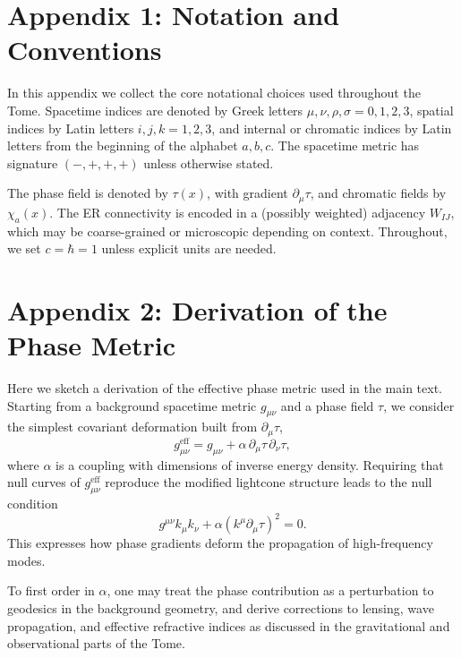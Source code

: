 

\appendix
\renewcommand{\thechapter}{\arabic{chapter}}

\chapter{Appendix 1: Notation and Conventions}

In this appendix we collect the core notational choices used throughout the Tome.
Spacetime indices are denoted by Greek letters \(\mu,\nu,\rho,\sigma = 0,1,2,3\), spatial indices by Latin letters \(i,j,k = 1,2,3\), and internal or chromatic indices by Latin letters from the beginning of the alphabet \(a,b,c\).
The spacetime metric has signature \((-,+,+,+)\) unless otherwise stated.

The phase field is denoted by \(\tau(x)\), with gradient \(\partial_\mu \tau\), and chromatic fields by \(\chi_a(x)\).
The ER connectivity is encoded in a (possibly weighted) adjacency \(W_{IJ}\), which may be coarse-grained or microscopic depending on context.
Throughout, we set \(c = \hbar = 1\) unless explicit units are needed.

\chapter{Appendix 2: Derivation of the Phase Metric}

Here we sketch a derivation of the effective phase metric used in the main text.
Starting from a background spacetime metric \(g_{\mu\nu}\) and a phase field \(\tau\), we consider the simplest covariant deformation built from \(\partial_\mu \tau\),
\[
g^{\mathrm{eff}}_{\mu\nu}
  = g_{\mu\nu}
  + \alpha\,\partial_\mu \tau\,\partial_\nu \tau,
\]
where \(\alpha\) is a coupling with dimensions of inverse energy density.
Requiring that null curves of \(g^{\mathrm{eff}}_{\mu\nu}\) reproduce the modified lightcone structure leads to the null condition
\[
g^{\mu\nu}k_\mu k_\nu + \alpha (k^\mu \partial_\mu \tau)^2 = 0.
\]
This expresses how phase gradients deform the propagation of high-frequency modes.

To first order in \(\alpha\), one may treat the phase contribution as a perturbation to geodesics in the background geometry, and derive corrections to lensing, wave propagation, and effective refractive indices as discussed in the gravitational and observational parts of the Tome.

